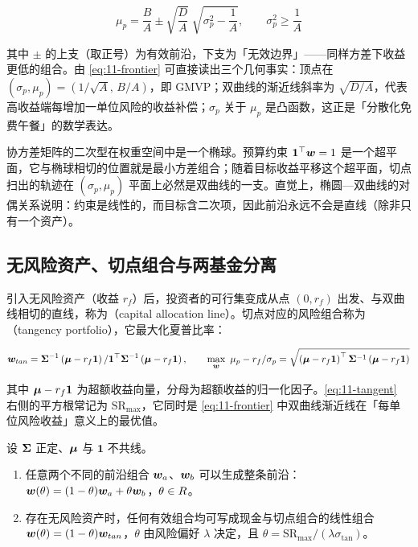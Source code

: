 \begin{equation}\label{eq:11-frontier}
  \mu_p = \frac{B}{A} \pm \sqrt{\frac{D}{A}}\;\sqrt{\sigma_p^{2} - \frac{1}{A}},
  \qquad \sigma_p^{2} \ge \frac{1}{A}
\end{equation}

其中 $\pm$ 的上支（取正号）为有效前沿，下支为「无效边界」——同样方差下收益更低的组合。由 \cref{eq:11-frontier} 可直接读出三个几何事实：顶点在 $(\sigma_p, \mu_p) = (1/\sqrt{A},\, B/A)$，即 GMVP；双曲线的渐近线斜率为 $\sqrt{D/A}$，代表高收益端每增加一单位风险的收益补偿；$\sigma_p$ 关于 $\mu_p$ 是凸函数，这正是「分散化免费午餐」的数学表达。

\begin{intuitionbox}[为什么前沿是双曲线]
协方差矩阵的二次型在权重空间中是一个椭球。预算约束 $\mathbf{1}^{\top}\bm{w} = 1$ 是一个超平面，它与椭球相切的位置就是最小方差组合；随着目标收益平移这个超平面，切点扫出的轨迹在 $(\sigma_p,\mu_p)$ 平面上必然是双曲线的一支。直觉上，椭圆—双曲线的对偶关系说明：约束是线性的，而目标含二次项，因此前沿永远不会是直线（除非只有一个资产）。
\end{intuitionbox}

\subsection{无风险资产、切点组合与两基金分离}

引入无风险资产（收益 $r_f$）后，投资者的可行集变成从点 $(0, r_f)$ 出发、与双曲线相切的直线，称为（capital allocation line）。切点对应的风险组合称为（tangency portfolio），它最大化夏普比率：

\begin{equation}\label{eq:11-tangent}
  \bm{w}_{tan} = \bm{\Sigma}^{-1}\left(\bm{\mu} - r_f\mathbf{1}\right)/\mathbf{1}^{\top}\bm{\Sigma}^{-1}\left(\bm{\mu} - r_f\mathbf{1}\right),
  \qquad
  \max_{\bm{w}}\ \mu_p - r_f/\sigma_p = \sqrt{\left(\bm{\mu} - r_f\mathbf{1}\right)^{\top}\bm{\Sigma}^{-1}\left(\bm{\mu} - r_f\mathbf{1}\right)}
\end{equation}

其中 $\bm{\mu} - r_f\mathbf{1}$ 为超额收益向量，分母为超额收益的归一化因子。\cref{eq:11-tangent} 右侧的平方根常记为 $\text{SR}_{\max}$，它同时是 \cref{eq:11-frontier} 中双曲线渐近线在「每单位风险收益」意义上的最优值。

\begin{theorem}[两基金分离定理]\label{thm:11-twofund}
设 $\bm{\Sigma}$ 正定、$\bm{\mu}$ 与 $\mathbf{1}$ 不共线。
\begin{enumerate}[leftmargin=2em, itemsep=2pt]
  \item 任意两个不同的前沿组合 $\bm{w}_a$、$\bm{w}_b$ 可以生成整条前沿：$\bm{w}(\theta) = (1-\theta)\bm{w}_a + \theta\bm{w}_b$，$\theta \in R$。
  \item 存在无风险资产时，任何有效组合均可写成现金与切点组合的线性组合 $\bm{w}(\theta) = (1-\theta)\bm{w}_{tan}$，$\theta$ 由风险偏好 $\lambda$ 决定，且 $\theta = \text{SR}_{\max}/(\lambda\sigma_{\text{tan}})$。
\end{enumerate}
\end{theorem}

